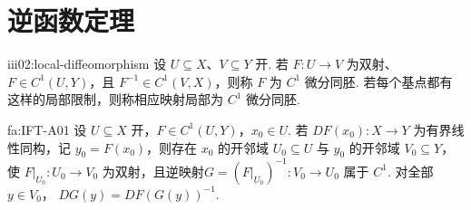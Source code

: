 \section{逆函数定理}\label{sec:iii02-inverse}

\begin{FADefinition}{iii02:local-diffeomorphism}
设 \(\displaystyle U\subseteq X\)、\(\displaystyle V\subseteq Y\) 开. 若 \(\displaystyle F:U\to V\) 为双射、\(\displaystyle F\in C^1(U,Y)\)，且 \(\displaystyle F^{-1}\in C^1(V,X)\)，则称 \(\displaystyle F\) 为 \(\displaystyle C^1\) 微分同胚. 若每个基点都有这样的局部限制，则称相应映射局部为 \(\displaystyle C^1\) 微分同胚.
\end{FADefinition}

\begin{FATheorem}{fa:IFT-A01}
设 \(\displaystyle U\subseteq X\) 开，\(\displaystyle F\in C^1(U,Y)\)，\(\displaystyle x_0\in U\). 若
\(\displaystyle DF(x_0):X\to Y\)
为有界线性同构，记 \(\displaystyle y_0=F(x_0)\)，则存在 \(\displaystyle x_0\) 的开邻域 \(\displaystyle U_0\subseteq U\) 与 \(\displaystyle y_0\) 的开邻域 \(\displaystyle V_0\subseteq Y\)，使
\(\displaystyle F|_{U_0}:U_0\to V_0\)
为双射，且逆映射\(\displaystyle G=(F|_{U_0})^{-1}:V_0\to U_0\) 属于 \(\displaystyle C^1\). 对全部 \(\displaystyle y\in V_0\)，
\(\displaystyle DG(y) = DF(G(y))^{-1}.\)
\end{FATheorem}

